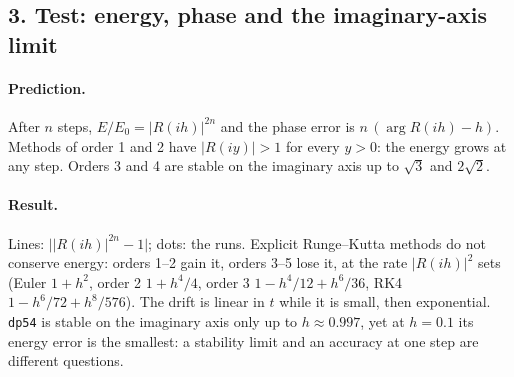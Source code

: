 \documentclass[11pt,a4paper]{article}
\begin{document}
\newpage
\subsection*{3. Test: energy, phase and the imaginary-axis limit}

\paragraph{Prediction.} After $n$ steps, $E/E_0 = |R(ih)|^{2n}$ and the
phase error is $n\,(\arg R(ih) - h)$. Methods of order 1 and 2 have
$|R(iy)| > 1$ for every $y > 0$: the energy grows at any step. Orders 3 and 4
are stable on the imaginary axis up to $\sqrt 3$ and $2\sqrt 2$.

\paragraph{Result.}
\begin{center}
\small

\end{center}

\begin{center}
\end{center}
Lines: $\bigl||R(ih)|^{2n} - 1\bigr|$; dots: the runs. Explicit Runge--Kutta
methods do not conserve energy: orders 1--2 gain it, orders 3--5 lose it, at
the rate $|R(ih)|^2$ sets (Euler $1 + h^2$, order 2 $1 + h^4/4$, order 3
$1 - h^4/12 + h^6/36$, RK4 $1 - h^6/72 + h^8/576$). The drift is linear in $t$
while it is small, then exponential. \texttt{dp54} is stable on the
imaginary axis only up to $h \approx 0.997$, yet at $h = 0.1$ its energy
error is the smallest: a stability limit and an accuracy at one step are
different questions.
\end{document}
